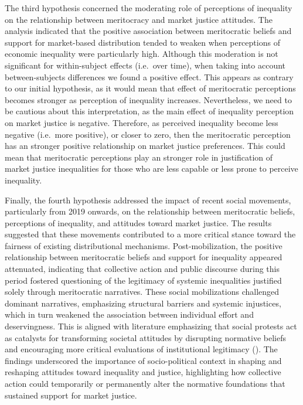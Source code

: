 \documentclass[
  12pt,
]{article}
\begin{document}
The third hypothesis concerned the moderating role of perceptions of
inequality on the relationship between meritocracy and market justice
attitudes. The analysis indicated that the positive association between
meritocratic beliefs and support for market-based distribution tended to
weaken when perceptions of economic inequality were particularly high.
Although this moderation is not significant for within-subject effects
(i.e.~over time), when taking into account between-subjects differences
we found a positive effect. This appears as contrary to our initial
hypothesis, as it would mean that effect of meritocratic perceptions
becomes stronger as perception of inequality increases. Nevertheless, we
need to be cautious about this interpretation, as the main effect of
inequality perception on market justice is negative. Therefore, as
perceived inequality become less negative (i.e.~more positive), or
closer to zero, then the meritocratic perception has an stronger
positive relationship on market justice preferences. This could mean
that meritocratic perceptions play an stronger role in justification of
market justice inequalities for those who are less capable or less prone
to perceive inequality.

Finally, the fourth hypothesis addressed the impact of recent social
movements, particularly from 2019 onwards, on the relationship between
meritocratic beliefs, perceptions of inequality, and attitudes toward
market justice. The results suggested that these movements contributed
to a more critical stance toward the fairness of existing distributional
mechanisms. Post-mobilization, the positive relationship between
meritocratic beliefs and support for inequality appeared attenuated,
indicating that collective action and public discourse during this
period fostered questioning of the legitimacy of systemic inequalities
justified solely through meritocratic narratives. These social
mobilizations challenged dominant narratives, emphasizing structural
barriers and systemic injustices, which in turn weakened the association
between individual effort and deservingness. This is aligned with
literature emphasizing that social protests act as catalysts for
transforming societal attitudes by disrupting normative beliefs and
encouraging more critical evaluations of institutional legitimacy
(). The
findings underscored the importance of socio-political context in
shaping and reshaping attitudes toward inequality and justice,
highlighting how collective action could temporarily or permanently
alter the normative foundations that sustained support for market
justice.
\end{document}
